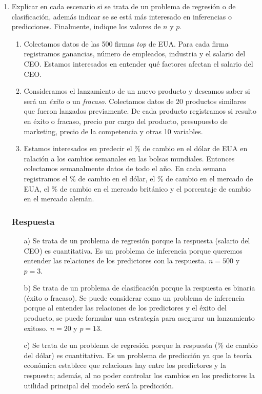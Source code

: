 \documentclass[11pt,letterpaper]{article}
\begin{document}
\begin{enumerate}
\item Explicar en cada escenario si se trata de un problema de regresión o de clasificación, además indicar se se está más interesado en inferencias o predicciones. Finalmente, indique los valores de $n$ y $p$.
\begin{enumerate}
	\item Colectamos datos de las 500 firmas \textit{top} de EUA. Para cada firma registramos ganancias, número de empleados, industria y el salario del CEO. Estamos interesados en entender qué factores afectan el salario del CEO.
	\item Consideramos el lanzamiento de un nuevo producto y deseamos saber si será un \textit{éxito} o un \textit{fracaso}. Colectamos datos de 20 productos similares que fueron lanzados previamente. De cada producto registramos si resulto en éxito o fracaso, precio por cargo del producto, presupuesto de marketing, precio de la competencia y otras 10 variables.
	\item Estamos interesados en predecir el $\%$ de cambio en el dólar de EUA en ralación a los cambios semanales en las bolsas mundiales. Entonces colectamos semanalmente datos de todo el año. En cada semana registramos el $\%$ de cambio en el dólar, el $\%$ de cambio en el mercado de EUA, el $\%$ de cambio en el mercado británico y el porcentaje de cambio en el mercado alemán.
\end{enumerate}

\subsubsection*{Respuesta}
\begin{enumerate}
	\item[a)] Se trata de un problema de regresión porque la respuesta (salario del CEO) es cuantitativa. Es un problema de inferencia porque queremos entender las relaciones de los predictores con la respuesta. $n=500$ y $p=3$.
	\item[b)] Se trata de un problema de clasificación porque la respuesta es binaria (éxito o fracaso). Se puede considerar como un problema de inferencia porque al entender las relaciones de los predictores y el éxito del producto, se puede formular una estrategía para asegurar un lanzamiento exitoso. $n=20$ y $p=13$.
	\item[c)] Se trata de un problema de regresión porque la respuesta ($\%$ de cambio del dólar) es cuantitativa. Es un problema de predicción ya que la teoría económica establece que relaciones hay entre los predictores y la respuesta; además, al no poder controlar los cambios en los predictores la utilidad principal del modelo será la predicción.
\end{enumerate}

\end{enumerate}
\end{document}
